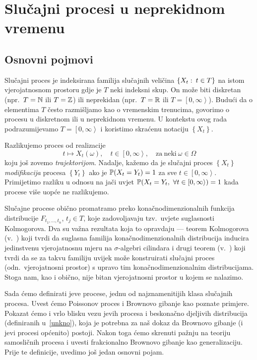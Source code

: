 \documentclass[main.tex]{subfiles}
\begin{document}
\nocite{*}

\chapter{Slučajni procesi u neprekidnom vremenu} \label{ch:sp}
\section{Osnovni pojmovi} \label{sec:sp-osnovni}
Slučajni proces je indeksirana familija slučajnih veličina \( \left\{ X_t \st t \in T \right\} \) na istom vjerojatnosnom prostoru
gdje je \( T \) neki indeksni skup. On može biti diskretan (npr.\ \( T = \N \) ili \( T = \Z \))
ili neprekidan (npr.\ \( T = \R \) ili \( T = \left[ 0, \infty \right\rangle  \)). Budući da o
elementima \( T \) često razmišljamo kao o vremenskim trenucima, govorimo o procesu u diskretnom
ili u neprekidnom vremenu.
U kontekstu ovog rada podrazumijevamo \( T = \left[ 0,\infty \right\rangle \) i koristimo skraćenu notaciju
\( \left\{ X_t \right\} \).

Razlikujemo proces od realizacije
\[ t \mapsto X_t(\omega), \quad t \in \left[ 0,\infty \right\rangle, \quad \mathrm{za \ neki} \ \omega \in \Omega \]
koju još zovemo \emph{trajektorijom}. Nadalje, kažemo da je slučajni proces \( \left\{ X_t \right\} \) \emph{modifikacija} procesa
\( \left\{ Y_t \right\} \) ako je \( \P(X_t = Y_t) = 1 \) za sve \( t \in \left[ 0,\infty \right\rangle \). Primijetimo razliku u odnosu
na jači uvjet \( \P(X_t = Y_t,\ \forall t \in \left[ 0,\infty \right\rangle) = 1 \) kada procese više uopće ne razlikujemo.

Slučajne procese obično promatramo preko konačnodimenzionalnih funkcija distribucije
\( F_{t_1, \ldots, t_n} \), \( t_j \in T \), koje zadovoljavaju tzv.\ uvjete suglasnosti Kolmogorova.
Dva su važna rezultata koja to opravdaju --- teorem Kolmogorova (v.~\cite[tm.\ 9.6.]{sarapa}) koji tvrdi
da suglasna familija konačnodimenzionalnih distribucija inducira je\-din\-stve\-nu vjerojatnosnu mjeru na \( \sigma \)-algebri cilindara
i drugi teorem (v.~\cite[tm.\ 9.7.]{sarapa}) koji tvrdi da se za takvu familiju uvijek može konstruirati
slučajni proces (odn.\ vjerojatnosni prostor) s upravo tim konačnodimenzionalnim distribucijama. Stoga nam, kao i obično,
nije bitan vjerojatnosni prostor u kojem se nalazimo.

Sada ćemo definirati \levy jeve procese, jednu od najznamenitijih klasa slučajnih procesa. Uvest ćemo Poissonov proces
i Brownovo gibanje kao poznate primjere. Pokazat ćemo i vrlo blisku vezu \levy jevih procesa i beskonačno djeljivih distribucija (definiranih u~\ref{unkno}), koja
je potrebna za naš dokaz da Brownovo gibanje (i \levy jevi procesi općenito) postoji. Nakon toga ćemo skrenuti pažnju na teoriju samosličnih procesa i uvesti
frakcionalno Brownovo gibanje kao generalizaciju. Prije te definicije, uvedimo još jedan osnovni pojam.
\end{document}
